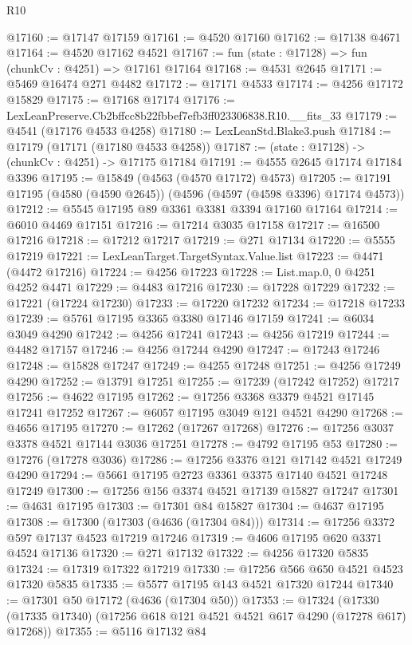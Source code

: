 \begin{lexlean}{R10}
\begin{coremodule}
@17160 := @17147 @17159
@17161 := @4520 @17160
@17162 := @17138 @4671
@17164 := @4520 @17162 @4521
@17167 := fun (state : @17128) => fun (chunkCv : @4251) => @17161 @17164
@17168 := @4531 @2645
@17171 := @5469 @16474 @271 @4482
@17172 := @17171 @4533
@17174 := @4256 @17172 @15829
@17175 := @17168 @17174
@17176 := LexLeanPreserve.Cb2bffcc8b22fbbef7efb3ff023306838.R10.__fits_33
@17179 := @4541 (@17176 @4533 @4258)
@17180 := LexLeanStd.Blake3.push
@17184 := @17179 (@17171 (@17180 @4533 @4258))
@17187 := (state : @17128) -> (chunkCv : @4251) -> @17175 @17184
@17191 := @4555 @2645 @17174 @17184 @3396
@17195 := @15849 (@4563 (@4570 @17172) @4573)
@17205 := @17191 @17195 (@4580 (@4590 @2645)) (@4596 (@4597 (@4598 @3396) @17174 @4573))
@17212 := @5545 @17195 @89 @3361 @3381 @3394 @17160 @17164
@17214 := @6010 @4469 @17151
@17216 := @17214 @3035 @17158
@17217 := @16500 @17216
@17218 := @17212 @17217
@17219 := @271 @17134
@17220 := @5555 @17219
@17221 := LexLeanTarget.TargetSyntax.Value.list
@17223 := @4471 (@4472 @17216)
@17224 := @4256 @17223
@17228 := List.map.{0, 0} @4251 @4252 @4471
@17229 := @4483 @17216
@17230 := @17228 @17229
@17232 := @17221 (@17224 @17230)
@17233 := @17220 @17232
@17234 := @17218 @17233
@17239 := @5761 @17195 @3365 @3380 @17146 @17159
@17241 := @6034 @3049 @4290
@17242 := @4256 @17241
@17243 := @4256 @17219
@17244 := @4482 @17157
@17246 := @4256 @17244 @4290
@17247 := @17243 @17246
@17248 := @15828 @17247
@17249 := @4255 @17248
@17251 := @4256 @17249 @4290
@17252 := @13791 @17251
@17255 := @17239 (@17242 @17252) @17217
@17256 := @4622 @17195
@17262 := @17256 @3368 @3379 @4521 @17145 @17241 @17252
@17267 := @6057 @17195 @3049 @121 @4521 @4290
@17268 := @4656 @17195
@17270 := @17262 (@17267 @17268)
@17276 := @17256 @3037 @3378 @4521 @17144 @3036 @17251
@17278 := @4792 @17195 @53
@17280 := @17276 (@17278 @3036)
@17286 := @17256 @3376 @121 @17142 @4521 @17249 @4290
@17294 := @5661 @17195 @2723 @3361 @3375 @17140 @4521 @17248 @17249
@17300 := @17256 @156 @3374 @4521 @17139 @15827 @17247
@17301 := @4631 @17195
@17303 := @17301 @84 @15827
@17304 := @4637 @17195
@17308 := @17300 (@17303 (@4636 (@17304 @84)))
@17314 := @17256 @3372 @597 @17137 @4523 @17219 @17246
@17319 := @4606 @17195 @620 @3371 @4524 @17136
@17320 := @271 @17132
@17322 := @4256 @17320 @5835
@17324 := @17319 @17322 @17219
@17330 := @17256 @566 @650 @4521 @4523 @17320 @5835
@17335 := @5577 @17195 @143 @4521 @17320 @17244
@17340 := @17301 @50 @17172 (@4636 (@17304 @50))
@17353 := @17324
    (@17330 (@17335 @17340) (@17256 @618 @121 @4521 @4521 @617 @4290 (@17278 @617) @17268))
@17355 := @5116 @17132 @84

\end{coremodule}
\end{lexlean}

